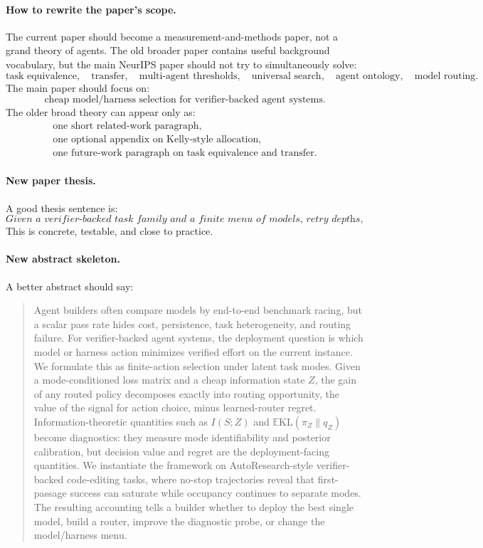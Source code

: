 \documentclass{article}
\providecommand{\KL}{\mathrm{KL}}
\begin{document}
\paragraph{How to rewrite the paper's scope.}
The current paper should become a measurement-and-methods paper, not a grand theory of
agents.
The old broader paper contains useful background vocabulary, but the main NeurIPS paper
should not try to simultaneously solve:
\[
    \text{task equivalence},\quad
    \text{transfer},\quad
    \text{multi-agent thresholds},\quad
    \text{universal search},\quad
    \text{agent ontology},\quad
    \text{model routing}.
\]
The main paper should focus on:
\[
    \boxed{
    \text{cheap model/harness selection for verifier-backed agent systems.}
    }
\]
The older broad theory can appear only as:
\[
\begin{array}{ll}
    \text{one short related-work paragraph},\\
    \text{one optional appendix on Kelly-style allocation},\\
    \text{one future-work paragraph on task equivalence and transfer}.
\end{array}
\]

\paragraph{New paper thesis.}
A good thesis sentence is:
\[
    \textit{
    Given a verifier-backed task family and a finite menu of models, retry depths,
    fallback rules, and routers, we estimate deployment loss, routing opportunity,
    learned-router regret, and selection regret from reusable mode-conditioned pilots.
    }
\]
This is concrete, testable, and close to practice.

\paragraph{New abstract skeleton.}
A better abstract should say:
\begin{quote}
Agent builders often compare models by end-to-end benchmark racing, but a scalar pass
rate hides cost, persistence, task heterogeneity, and routing failure.
For verifier-backed agent systems, the deployment question is which model or harness action
minimizes verified effort on the current instance.
We formulate this as finite-action selection under latent task modes.
Given a mode-conditioned loss matrix and a cheap information state \(Z\), the gain of any
routed policy decomposes exactly into routing opportunity, the value of the signal for action
choice, minus learned-router regret.
Information-theoretic quantities such as \(I(S;Z)\) and
\(\mathbb E\KL(\pi_Z\|q_Z)\) become diagnostics: they measure mode identifiability and
posterior calibration, but decision value and regret are the deployment-facing quantities.
We instantiate the framework on AutoResearch-style verifier-backed code-editing tasks,
where no-stop trajectories reveal that first-passage success can saturate while occupancy
continues to separate modes.
The resulting accounting tells a builder whether to deploy the best single model, build a
router, improve the diagnostic probe, or change the model/harness menu.
\end{quote}
\end{document}
